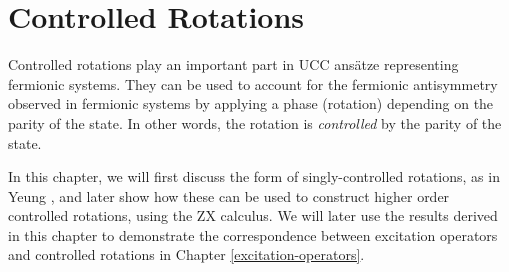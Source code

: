 \chapter{Controlled Rotations}%
\label{controlled-rotations}

Controlled rotations play an important part in UCC ansätze representing fermionic systems. They can be used to account for the fermionic antisymmetry observed in fermionic systems by applying a phase (rotation) depending on the parity of the state. In other words, the rotation is \textit{controlled} by the parity of the state.

In this chapter, we will first discuss the form of singly-controlled rotations, as in Yeung \cite{Yeung2020}, and later show how these can be used to construct higher order controlled rotations, using the ZX calculus. We will later use the results derived in this chapter to demonstrate the correspondence between excitation operators and controlled rotations in Chapter \ref{excitation-operators}.
